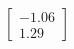\documentclass[preview]{standalone}
\begin{document}
\begin{align*}
\begin{bmatrix} -1.06 \\ 1.29 \end{bmatrix}
\end{align*}
\end{document}
